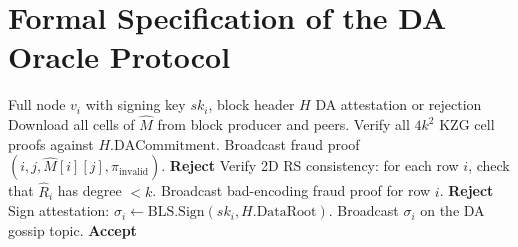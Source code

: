 \section{Formal Specification of the DA Oracle Protocol}

\label{app:oracle}

\begin{algorithm}[H]
\caption{DA Oracle Attestation Protocol}
\label{alg:da-oracle}
\begin{algorithmic}[1]
\Require Full node $v_i$ with signing key $sk_i$, block header $H$
\Ensure DA attestation or rejection
\State Download all cells of $\hat{M}$ from block producer and peers.
\State Verify all $4k^2$ KZG cell proofs against $H.\text{DACommitment}$.
    \State Broadcast fraud proof $(i, j, \hat{M}[i][j], \pi_{\text{invalid}})$.
    \State \Return \textbf{Reject}
\EndIf
\State Verify 2D RS consistency: for each row $i$, check that $\hat{R}_i$ has degree $< k$.
    \State Broadcast bad-encoding fraud proof for row $i$.
    \State \Return \textbf{Reject}
\EndIf
\State Sign attestation: $\sigma_i \gets \text{BLS.Sign}(sk_i, H.\text{DataRoot})$.
\State Broadcast $\sigma_i$ on the DA gossip topic.
\State \Return \textbf{Accept}
\end{algorithmic}
\end{algorithm}

